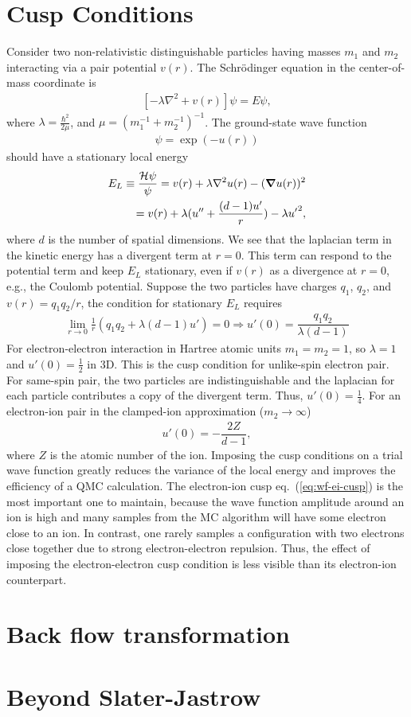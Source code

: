\section{Cusp Conditions}
Consider two non-relativistic distinguishable particles having masses $m_1$ and $m_2$ interacting via a pair potential $v(r)$. The Schr\"odinger equation in the center-of-mass coordinate is
\begin{align}
\left[-\lambda\nabla^2 + v(r)\right] \psi = E\psi,
\end{align}
where $\lambda=\frac{\hbar^2}{2\mu}$, and $\mu=(m_1^{-1}+m_2^{-1})^{-1}$. The ground-state wave function
\begin{align}
\psi = \exp(-u(r))
\end{align}
should have a stationary local energy
\begin{align} \label{eq:wf-cusp}
E_L \equiv \dfrac{\mathcal{H}\psi}{\psi} = v(r) + \lambda\nabla^2u(r) - (\boldsymbol{\nabla}u(r))^2 \nonumber \\
= v(r) + \lambda (u''+\frac{(d-1)u'}{r}) - \lambda {u'}^2,
\end{align}
where $d$ is the number of spatial dimensions.
We see that the laplacian term in the kinetic energy has a divergent term at $r=0$.
This term can respond to the potential term and keep $E_L$ stationary, even if $v(r)$ as a divergence at $r=0$, e.g., the Coulomb potential. Suppose the two particles have charges $q_1$, $q_2$, and $v(r)=q_1q_2/r$, the condition for stationary $E_L$ requires
\begin{align}
\lim\limits_{r\rightarrow 0}\frac{1}{r} (q_1q_2+ \lambda (d-1) u')=0 \Rightarrow u'(0) = \dfrac{q_1q_2}{\lambda (d-1)}
\end{align}
For electron-electron interaction in Hartree atomic units $m_1=m_2=1$, so $\lambda=1$ and $u'(0)=\frac{1}{2}$ in 3D. This is the cusp condition for unlike-spin electron pair. For same-spin pair, the two particles are indistinguishable and the laplacian for each particle contributes a copy of the divergent term. Thus, $u'(0)=\frac{1}{4}$. For an electron-ion pair in the clamped-ion approximation ($m_2\rightarrow\infty$)
\begin{align} \label{eq:wf-ei-cusp}
u'(0) = -\dfrac{2Z}{d-1},
\end{align}
where $Z$ is the atomic number of the ion. Imposing the cusp conditions on a trial wave function greatly reduces the variance of the local energy and improves the efficiency of a QMC calculation. The electron-ion cusp eq.~(\ref{eq:wf-ei-cusp}) is the most important one to maintain, because the wave function amplitude around an ion is high and many samples from the MC algorithm will have some electron close to an ion. In contrast, one rarely samples a configuration with two electrons close together due to strong electron-electron repulsion. Thus, the effect of imposing the electron-electron cusp condition is less visible than its electron-ion counterpart.






\section{Back flow transformation}
\section{Beyond Slater-Jastrow}